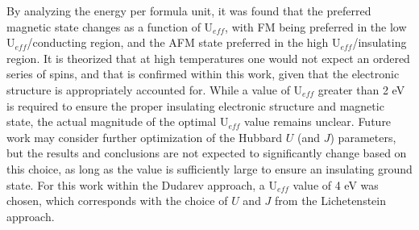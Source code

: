 \documentclass[preprint,3p,10pt,twocolumn,number,sort&compress]{elsarticle}
\begin{document}
By analyzing the energy per formula unit, it was found that the preferred magnetic state changes as a function of U$_{eff}$, with FM being preferred in the low U$_{eff}$/conducting region, and the AFM state preferred in the high U$_{eff}$/insulating region. It is theorized that at high temperatures one would not expect an ordered series of spins, and that is confirmed within this work, given that the electronic structure is appropriately accounted for. While a value of U$_{eff}$ greater than 2 eV is required to ensure the proper insulating electronic structure and magnetic state, the actual magnitude of the optimal U$_{eff}$ value remains unclear. Future work may consider further optimization of the Hubbard $U$ (and $J$) parameters, but the results and conclusions are not expected to significantly change based on this choice, as long as the value is sufficiently large to ensure an insulating ground state. For this work within the Dudarev approach, a U$_{eff}$ value of 4 eV was chosen, which corresponds with the choice of $U$ and $J$ from the Lichetenstein approach.



\end{document}
